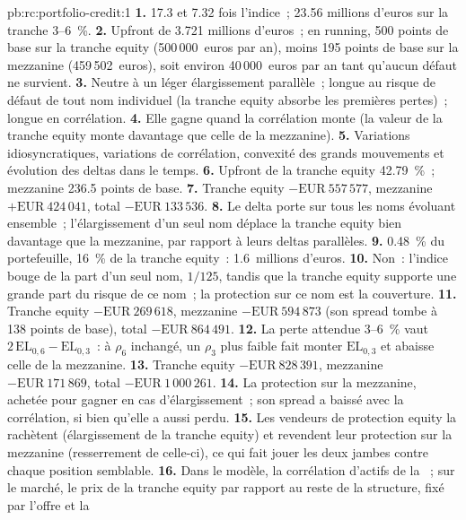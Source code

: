 \begin{solution}{pb:rc:portfolio-credit:1}
\textbf{1.} 17.3 et 7.32 fois l'indice~; 23.56 millions d'euros sur la tranche 3--6~\%.
\textbf{2.} Upfront de 3.721 millions d'euros~; en running, 500 points de base sur la tranche equity (500\,000~euros
par an), moins 195 points de base sur la mezzanine (459\,502~euros), soit environ 40\,000~euros par an tant qu'aucun
défaut ne survient.
\textbf{3.} Neutre à un léger élargissement parallèle~; longue au risque de défaut de tout nom individuel (la
tranche equity absorbe les premières pertes)~; longue en corrélation.
\textbf{4.} Elle gagne quand la corrélation monte (la valeur de la tranche equity monte davantage que celle de la
mezzanine).
\textbf{5.} Variations idiosyncratiques, variations de corrélation, convexité des grands mouvements et
évolution des deltas dans le temps.
\textbf{6.} Upfront de la tranche equity 42.79~\%~; mezzanine 236.5 points de base.
\textbf{7.} Tranche equity $-\text{EUR}~557\,577$, mezzanine $+\text{EUR}~424\,041$, total
$-\text{EUR}~133\,536$.
\textbf{8.} Le delta porte sur tous les noms évoluant ensemble~; l'élargissement d'un seul nom déplace la
tranche equity bien davantage que la mezzanine, par rapport à leurs deltas parallèles.
\textbf{9.} 0.48~\% du portefeuille, 16~\% de la tranche equity~: 1.6~millions d'euros.
\textbf{10.} Non~: l'indice bouge de la part d'un seul nom, $1/125$, tandis que la tranche equity supporte une grande
part du risque de ce nom~; la protection sur ce nom est la couverture.
\textbf{11.} Tranche equity $-\text{EUR}~269\,618$, mezzanine $-\text{EUR}~594\,873$ (son spread tombe à 138
points de base), total $-\text{EUR}~864\,491$.
\textbf{12.} La perte attendue 3--6~\% vaut $2\,\mathrm{EL}_{0,6}-\mathrm{EL}_{0,3}$~: à $\rho_6$ inchangé, un $\rho_3$
plus faible fait monter $\mathrm{EL}_{0,3}$ et abaisse celle de la mezzanine.
\textbf{13.} Tranche equity $-\text{EUR}~828\,391$, mezzanine $-\text{EUR}~171\,869$, total $-\text{EUR}~1\,000\,261$.
\textbf{14.} La protection sur la mezzanine, achetée pour gagner en cas d'élargissement~; son spread a baissé avec
la corrélation, si bien qu'elle a aussi perdu.
\textbf{15.} Les vendeurs de protection equity la rachètent (élargissement de la tranche equity) et revendent leur
protection sur la mezzanine (resserrement de celle-ci), ce qui fait jouer les deux jambes contre chaque position semblable.
\textbf{16.} Dans le modèle, la corrélation d'actifs de la ~; sur le marché, le
prix de la tranche equity par rapport au reste de la structure, fixé par l'offre et la

\end{solution}
